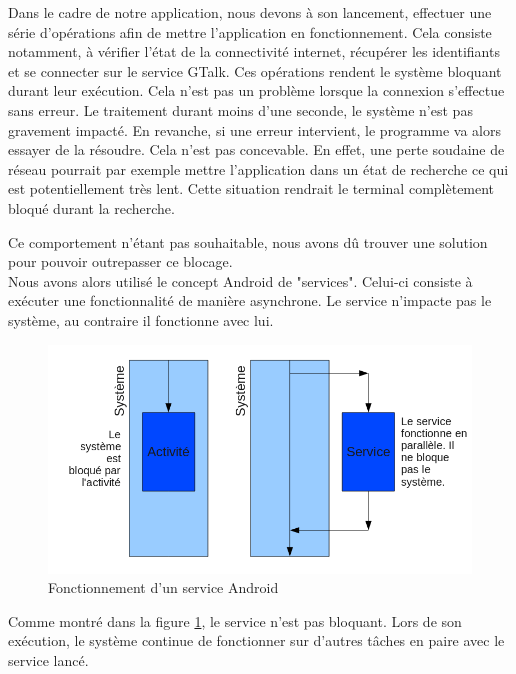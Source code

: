 Dans le cadre de notre application, nous devons à son lancement, effectuer une série d'opérations 
afin de mettre l'application en fonctionnement. Cela consiste notamment, à vérifier l'état de la 
connectivité internet, récupérer les identifiants et se connecter sur le service GTalk. Ces 
opérations rendent le système bloquant durant leur exécution. Cela n'est pas un problème lorsque la 
connexion s'effectue sans erreur. Le traitement durant moins d'une seconde, le système n'est pas
gravement impacté. En revanche, si une erreur intervient, le programme va alors essayer de la résoudre.
Cela n'est pas concevable. En effet, une perte soudaine de réseau pourrait par exemple mettre 
l'application dans un état de recherche ce qui est potentiellement très lent. Cette situation rendrait
le terminal complètement bloqué durant la recherche. 

Ce comportement n'étant pas souhaitable, nous avons dû trouver une solution pour pouvoir outrepasser ce blocage.
\\


Nous avons alors utilisé le concept Android de "services". Celui-ci consiste à exécuter une fonctionnalité 
de manière asynchrone. Le service n'impacte pas le système, au contraire il fonctionne avec lui. 
 
\begin{figure}[!h]
  \center
  \includegraphics[width=13cm]{img/fonctionnement-des-services-android.png}
  \caption{Fonctionnement d'un service Android}
  \label{fonctionnement-des-services-android}
\end{figure}

Comme montré dans la figure \ref{fonctionnement-des-services-android}, le service n'est pas  bloquant. 
Lors de son exécution, le système continue de fonctionner sur d'autres tâches en paire avec le service lancé.
\\


